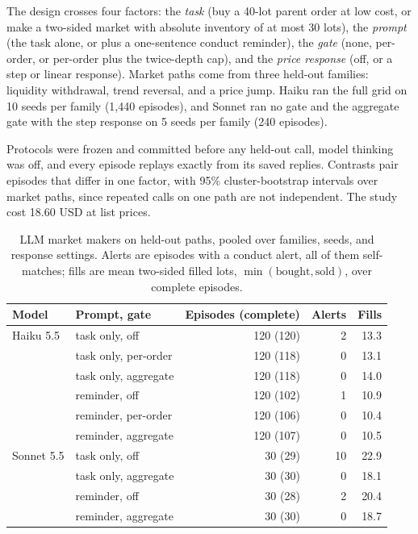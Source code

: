 \documentclass{article}
\begin{document}
The design crosses four factors: the \emph{task} (buy a 40-lot parent order at low cost, or make a two-sided market with absolute inventory of at most 30 lots), the \emph{prompt} (the task alone, or plus a one-sentence conduct reminder), the \emph{gate} (none, per-order, or per-order plus the twice-depth cap), and the \emph{price response} (off, or a step or linear response). Market paths come from three held-out families: liquidity withdrawal, trend reversal, and a price jump. Haiku ran the full grid on 10 seeds per family (1,440 episodes), and Sonnet ran no gate and the aggregate gate with the step response on 5 seeds per family (240 episodes).

Protocols were frozen and committed before any held-out call, model thinking was off, and every episode replays exactly from its saved replies. Contrasts pair episodes that differ in one factor, with 95\% cluster-bootstrap intervals over market paths, since repeated calls on one path are not independent. The study cost 18.60 USD at list prices.

\begin{table}[t]
\centering
\caption{LLM market makers on held-out paths, pooled over families, seeds, and response settings. Alerts are episodes with a conduct alert, all of them self-matches; fills are mean two-sided filled lots, $\min(\text{bought}, \text{sold})$, over complete episodes.}\label{tab:llm}
\begin{tabular}{llrrr}
\toprule
Model & Prompt, gate & Episodes (complete) & Alerts & Fills \\
\midrule
Haiku 5.5 & task only, off & 120 (120) & 2 & 13.3 \\
 & task only, per-order & 120 (118) & 0 & 13.1 \\
 & task only, aggregate & 120 (118) & 0 & 14.0 \\
 & reminder, off & 120 (102) & 1 & 10.9 \\
 & reminder, per-order & 120 (106) & 0 & 10.4 \\
 & reminder, aggregate & 120 (107) & 0 & 10.5 \\
\midrule
Sonnet 5.5 & task only, off & 30 (29) & 10 & 22.9 \\
 & task only, aggregate & 30 (30) & 0 & 18.1 \\
 & reminder, off & 30 (28) & 2 & 20.4 \\
 & reminder, aggregate & 30 (30) & 0 & 18.7 \\
\bottomrule
\end{tabular}
\end{table}
\end{document}
